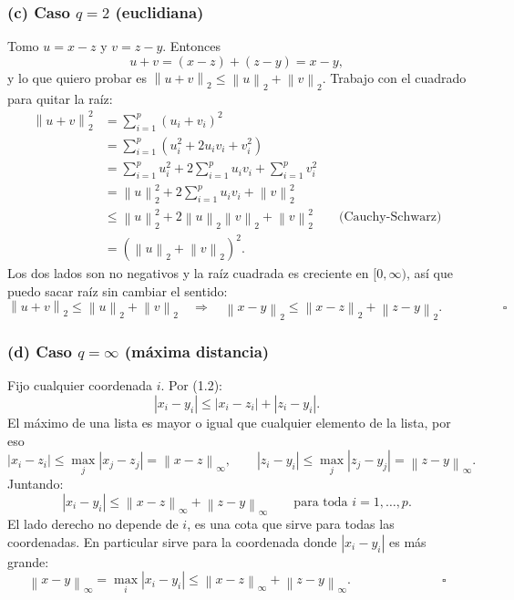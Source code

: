 \documentclass[11pt]{article}\usepackage[]{graphicx}\usepackage[]{xcolor}
\newcommand{\norm}[1]{\left\lVert #1 \right\rVert}
\begin{document}
\subsubsection*{(c) Caso $q=2$ (euclidiana)}

Tomo $u = x - z$ y $v = z - y$. Entonces
\[
u + v = (x - z) + (z - y) = x - y,
\]
y lo que quiero probar es $\norm{u+v}_2 \le \norm{u}_2 + \norm{v}_2$. Trabajo con el cuadrado para quitar la raíz:
\begin{align*}
\norm{u+v}_2^2 &= \sum_{i=1}^p (u_i + v_i)^2\\
&= \sum_{i=1}^p \left(u_i^2 + 2u_iv_i + v_i^2\right)\\
&= \sum_{i=1}^p u_i^2 + 2\sum_{i=1}^p u_iv_i + \sum_{i=1}^p v_i^2\\
&= \norm{u}_2^2 + 2\sum_{i=1}^p u_iv_i + \norm{v}_2^2\\
&\le \norm{u}_2^2 + 2\norm{u}_2\norm{v}_2 + \norm{v}_2^2 \qquad \text{(Cauchy-Schwarz)}\\
&= \left(\norm{u}_2 + \norm{v}_2\right)^2.
\end{align*}
Los dos lados son no negativos y la raíz cuadrada es creciente en $[0,\infty)$, así que puedo sacar raíz sin cambiar el sentido:
\[
\norm{u+v}_2 \le \norm{u}_2 + \norm{v}_2
\quad\Longrightarrow\quad
\norm{x-y}_2 \le \norm{x-z}_2 + \norm{z-y}_2. \hspace{2cm}\square
\]

\subsubsection*{(d) Caso $q=\infty$ (máxima distancia)}

Fijo cualquier coordenada $i$. Por (1.2):
\[
|x_i - y_i| \le |x_i - z_i| + |z_i - y_i|.
\]
El máximo de una lista es mayor o igual que cualquier elemento de la lista, por eso
\[
|x_i - z_i| \le \max_{j} |x_j - z_j| = \norm{x-z}_\infty,
\qquad
|z_i - y_i| \le \max_{j} |z_j - y_j| = \norm{z-y}_\infty.
\]
Juntando:
\[
|x_i - y_i| \le \norm{x-z}_\infty + \norm{z-y}_\infty \qquad \text{para toda } i = 1,\dots,p.
\]
El lado derecho no depende de $i$, es una cota que sirve para todas las coordenadas. En particular sirve para la coordenada donde $|x_i - y_i|$ es más grande:
\[
\norm{x-y}_\infty = \max_{i} |x_i - y_i| \le \norm{x-z}_\infty + \norm{z-y}_\infty. \hspace{3cm}\square
\]
\end{document}
